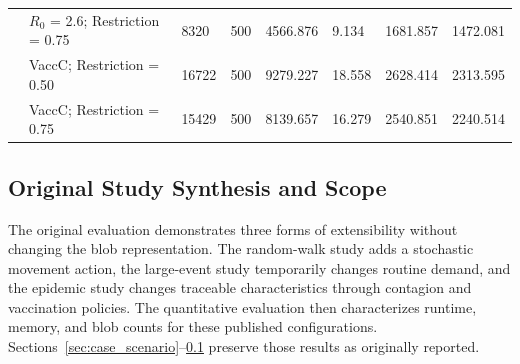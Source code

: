 \documentclass[pdflatex,sn-mathphys-num]{sn-jnl}%
\theoremstyle{thmstyleone}%
\theoremstyle{thmstyletwo}%
\theoremstyle{thmstylethree}%
\begin{document}
\begin{table}[ht]
{\begin{tabular}{@{}clllllll@{}}
                                                                                                                       & $R_0$ = 2.6; Restriction = 0.75      & 8320                                                                         & 500                                                                            & 4566.876                                                                       & 9.134                                                                            & 1681.857                                                                                & 1472.081                                                                                 \\
                                                                                                                       & VaccC; Restriction = 0.50         & 16722                                                                        & 500                                                                            & 9279.227                                                                       & 18.558                                                                           & 2628.414                                                                                & 2313.595                                                                                 \\
                                                                                                                       & VaccC; Restriction = 0.75         & 15429                                                                        & 500                                                                            & 8139.657                                                                       & 16.279                                                                           & 2540.851                                                                                & 2240.514                                                                                 \\ \bottomrule
\end{tabular}
} %
\end{table}

\begingroup\color{red}
\subsection{Original Study Synthesis and Scope}
\label{sec:comments}

The original evaluation demonstrates three forms of extensibility without changing the blob representation. The random-walk study adds a stochastic movement action, the large-event study temporarily changes routine demand, and the epidemic study changes traceable characteristics through contagion and vaccination policies. The quantitative evaluation then characterizes runtime, memory, and blob counts for these published configurations. Sections~\ref{sec:case_scenario}--\ref{sec:comments} preserve those results as originally reported.
\end{document}
